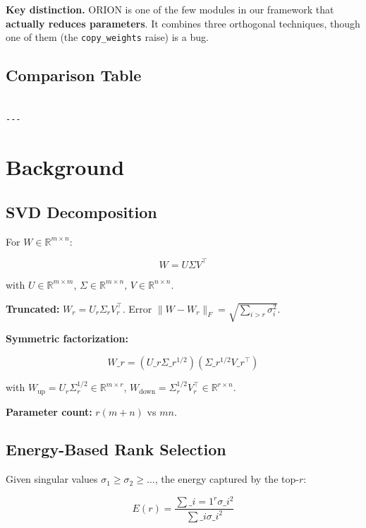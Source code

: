 \textbf{Key distinction.} ORION is one of the few modules in our framework 
that \textbf{actually reduces parameters}. It combines three orthogonal 
techniques, though one of them (the \texttt{copy\_weights} raise) is a bug.



\subsection{Comparison Table}

\begin{lstlisting}

---
\end{lstlisting}


\section{Background}

\subsection{SVD Decomposition}

For $W \in \mathbb{R}^{m \times n}$:

\[
W = U \Sigma V^\top
\tag{3.1}
\]

with $U \in \mathbb{R}^{m \times m}$, $\Sigma \in \mathbb{R}^{m \times n}$, 
$V \in \mathbb{R}^{n \times n}$.

\textbf{Truncated:} $W_r = U_r \Sigma_r V_r^\top$. Error $\|W - W_r\|_F = \sqrt{\sum_{i > r} \sigma_i^2}$.

\textbf{Symmetric factorization:}

\[
W\_r = (U\_r \Sigma\_r^{1/2})(\Sigma\_r^{1/2} V\_r^\top)
\tag{3.2}
\]

with $W_\text{up} = U_r \Sigma_r^{1/2} \in \mathbb{R}^{m \times r}$, 
$W_\text{down} = \Sigma_r^{1/2} V_r^\top \in \mathbb{R}^{r \times n}$.

\textbf{Parameter count:} $r(m + n)$ vs $mn$.

\subsection{Energy-Based Rank Selection}

Given singular values $\sigma_1 \geq \sigma_2 \geq \dots$, the energy 
captured by the top-$r$:

\[
E(r) = \frac{\sum\_{i=1}^{r} \sigma\_i^2}{\sum\_i \sigma\_i^2}
\tag{3.3}
\]

